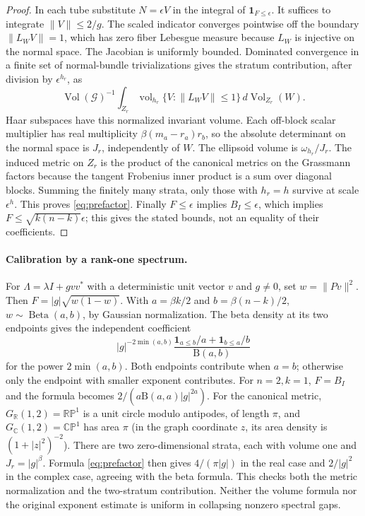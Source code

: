 \documentclass[11pt]{article}
\begin{document}
\begin{proof}
In each tube substitute $N=\epsilon V$ in the integral of $\mathbf1_{F\le\epsilon}$. It suffices to integrate $\|V\|\le 2/g$. The scaled indicator converges pointwise off the boundary $\|L_W V\|=1$, which has zero fiber Lebesgue measure because $L_W$ is injective on the normal space. The Jacobian is uniformly bounded. Dominated convergence in a finite set of normal-bundle trivializations gives the stratum contribution, after division by $\epsilon^{h_r}$, as
\[
 \operatorname{Vol}(\mathcal G)^{-1}
 \int_{Z_r}\operatorname{vol}_{h_r}\{V:\|L_W V\|\le1\}\,d\operatorname{Vol}_{Z_r}(W).
\]
Haar subspaces have this normalized invariant volume. Each off-block scalar multiplier has real multiplicity $\beta(m_a-r_a)r_b$, so the absolute determinant on the normal space is $J_r$, independently of $W$. The ellipsoid volume is $\omega_{h_r}/J_r$. The induced metric on $Z_r$ is the product of the canonical metrics on the Grassmann factors because the tangent Frobenius inner product is a sum over diagonal blocks. Summing the finitely many strata, only those with $h_r=h$ survive at scale $\epsilon^h$. This proves \eqref{eq:prefactor}. Finally $F\le\epsilon$ implies $B_I\le\epsilon$, which implies $F\le\sqrt{k(n-k)}\epsilon$; this gives the stated bounds, not an equality of their coefficients.
\end{proof}

\paragraph{Calibration by a rank-one spectrum.}
For $\Lambda=\lambda I+g vv^*$ with a deterministic unit vector $v$ and $g\ne0$, set $w=\|Pv\|^2$. Then $F=|g|\sqrt{w(1-w)}$. With $a=\beta k/2$ and $b=\beta(n-k)/2$, $w\sim\operatorname{Beta}(a,b)$, by Gaussian normalization. The beta density at its two endpoints gives the independent coefficient
\[
 |g|^{-2\min(a,b)}\frac{\mathbf1_{a\le b}/a+\mathbf1_{b\le a}/b}{\mathrm B(a,b)}
\]
for the power $2\min(a,b)$. Both endpoints contribute when $a=b$; otherwise only the endpoint with smaller exponent contributes. For $n=2,k=1$, $F=B_I$ and the formula becomes $2/(a\mathrm B(a,a)|g|^{2a})$. For the canonical metric, $G_{\mathbb R}(1,2)=\mathbb{RP}^1$ is a unit circle modulo antipodes, of length $\pi$, and $G_{\mathbb C}(1,2)=\mathbb{CP}^1$ has area $\pi$ (in the graph coordinate $z$, its area density is $(1+|z|^2)^{-2}$). There are two zero-dimensional strata, each with volume one and $J_r=|g|^\beta$. Formula \eqref{eq:prefactor} then gives $4/(\pi |g|)$ in the real case and $2/|g|^2$ in the complex case, agreeing with the beta formula. This checks both the metric normalization and the two-stratum contribution. Neither the volume formula nor the original exponent estimate is uniform in collapsing nonzero spectral gaps.
\end{document}
